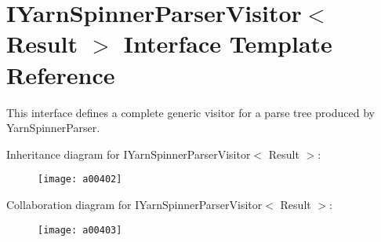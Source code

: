 \hypertarget{a00125}{\section{I\-Yarn\-Spinner\-Parser\-Visitor$<$ Result $>$ Interface Template Reference}
\label{a00125}
}


This interface defines a complete generic visitor for a parse tree produced by Yarn\-Spinner\-Parser.  




Inheritance diagram for I\-Yarn\-Spinner\-Parser\-Visitor$<$ Result $>$\-:
\nopagebreak
\begin{figure}[H]
\begin{center}
\leavevmode
\texttt{[image: a00402]}
\end{center}
\end{figure}


Collaboration diagram for I\-Yarn\-Spinner\-Parser\-Visitor$<$ Result $>$\-:
\nopagebreak
\begin{figure}[H]
\begin{center}
\leavevmode
\texttt{[image: a00403]}
\end{center}
\end{figure}
